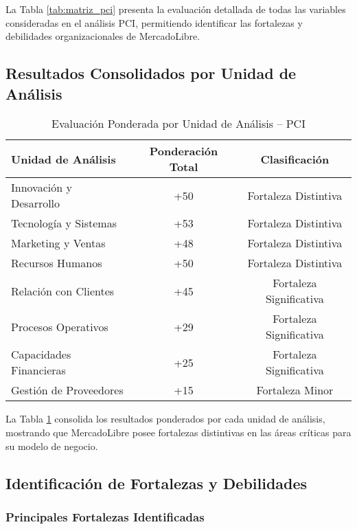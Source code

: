 La Tabla \ref{tab:matriz_pci} presenta la evaluación detallada de todas las variables consideradas en el análisis PCI, permitiendo identificar las fortalezas y debilidades organizacionales de MercadoLibre.

\subsection{Resultados Consolidados por Unidad de Análisis}

\begin{table}[H]
\centering
\begin{tabular}{|l|c|c|}
\hline
\textbf{Unidad de Análisis} & \textbf{Ponderación Total} & \textbf{Clasificación} \\
\hline
Innovación y Desarrollo & +50 & Fortaleza Distintiva \\
\hline
Tecnología y Sistemas & +53 & Fortaleza Distintiva \\
\hline
Marketing y Ventas & +48 & Fortaleza Distintiva \\
\hline
Recursos Humanos & +50 & Fortaleza Distintiva \\
\hline
Relación con Clientes & +45 & Fortaleza Significativa \\
\hline
Procesos Operativos & +29 & Fortaleza Significativa \\
\hline
Capacidades Financieras & +25 & Fortaleza Significativa \\
\hline
Gestión de Proveedores & +15 & Fortaleza Minor \\
\hline
\end{tabular}
\caption{Evaluación Ponderada por Unidad de Análisis -- PCI}
\label{tab:resultados_pci}
\end{table}

La Tabla \ref{tab:resultados_pci} consolida los resultados ponderados por cada unidad de análisis, mostrando que MercadoLibre posee fortalezas distintivas en las áreas críticas para su modelo de negocio.

\subsection{Identificación de Fortalezas y Debilidades}

\subsubsection{Principales Fortalezas Identificadas}

